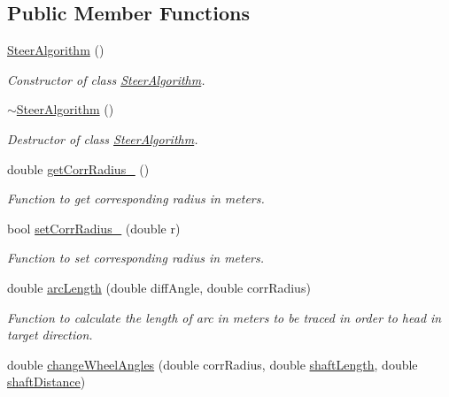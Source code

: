 \subsection*{Public Member Functions}
\begin{DoxyCompactItemize}
\item 
\hyperlink{class_steer_algorithm_af64dd94816ab9d00d85227a42b26a3e8}{Steer\+Algorithm} ()
\begin{DoxyCompactList}\small\item\em Constructor of class \hyperlink{class_steer_algorithm}{Steer\+Algorithm}. \end{DoxyCompactList}\item 
\hyperlink{class_steer_algorithm_a37dd2ef0ed856582aaacc103a6cd6700}{$\sim$\+Steer\+Algorithm} ()
\begin{DoxyCompactList}\small\item\em Destructor of class \hyperlink{class_steer_algorithm}{Steer\+Algorithm}. \end{DoxyCompactList}\item 
double \hyperlink{class_steer_algorithm_a06a7dd049280fab40d1b54c912daf399}{get\+Corr\+Radius\+\_\+} ()
\begin{DoxyCompactList}\small\item\em Function to get corresponding radius in meters. \end{DoxyCompactList}\item 
bool \hyperlink{class_steer_algorithm_a93cf1fc7d06376ddeaa4e81f2b0a22cc}{set\+Corr\+Radius\+\_\+} (double r)
\begin{DoxyCompactList}\small\item\em Function to set corresponding radius in meters. \end{DoxyCompactList}\item 
double \hyperlink{class_steer_algorithm_a17ff78af17e900f752237d274bcf751d}{arc\+Length} (double diff\+Angle, double corr\+Radius)
\begin{DoxyCompactList}\small\item\em Function to calculate the length of arc in meters to be traced in order to head in target direction. \end{DoxyCompactList}\item 
double \hyperlink{class_steer_algorithm_a6067af69593713f561890ae8ad23f5ff}{change\+Wheel\+Angles} (double corr\+Radius, double \hyperlink{class_steer_algorithm_a9d5bc20acba39f0e53c3d0f6fc280433}{shaft\+Length}, double \hyperlink{class_steer_algorithm_a38bc87552a30e8eda8f647cf341c9657}{shaft\+Distance})

\end{DoxyCompactItemize}
